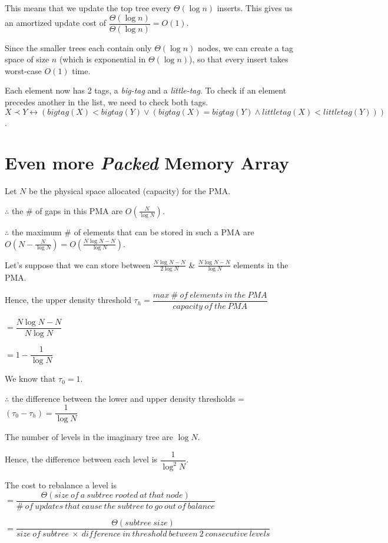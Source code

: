 \documentclass{article}
\begin{document}
This means that we update the top tree every $\Theta(\log{n})$
inserts. This gives us an amortized update cost of
$\dfrac{\Theta(\log{n})}{\Theta(\log{n})} = O(1)$.

Since the smaller trees each contain only $\Theta(\log{n})$ nodes, we
can create a tag space of size $n$ (which is exponential in
$\Theta(\log{n})$), so that every insert takes worst-case $O(1)$ time.

Each element now has 2 tags, a \textit{big-tag} and a
\textit{little-tag}. To check if an element precedes another in the
list, we need to check both tags. $X \prec Y \leftrightarrow
(bigtag(X) < bigtag(Y) \vee (bigtag(X) = bigtag(Y) \wedge littletag(X)
< littletag(Y)))$.

\clearpage

\section{Even more \textit{Packed} Memory Array}

Let $N$ be the physical space allocated (capacity) for the PMA.

$\therefore$ the \# of gaps in this PMA are $O(\frac{N}{\log{N}})$.

$\therefore$ the maximum \# of elements that can be stored in such a
PMA are $O(N - \frac{N}{\log{N}}) = O(\frac{N\log{N} - N}{\log{N}})$.

Let's suppose that we can store between $\frac{N\log{N} - N}{2\log{N}}$ \&
$\frac{N\log{N} - N}{\log{N}}$ elements in the PMA.

Hence, the upper density threshold $\tau_h = \dfrac{max\ \#\ of\ elements\ in\ the\ PMA}{capacity\ of\ the\ PMA}$

$= \dfrac{N\log{N} - N}{N\log{N}}$

$= 1 - \dfrac{1}{\log{N}}$

We know that $\tau_0 = 1$.

$\therefore$ the difference between the lower and upper density thresholds = $(\tau_0 - \tau_h) = \dfrac{1}{\log{N}}$

The number of levels in the imaginary tree are $\log{N}$.

Hence, the difference between each level is $\dfrac{1}{\log^2{N}}$.

The cost to rebalance a level is $= \dfrac{\Theta(size\ of\ a\ subtree\ rooted\ at\ that\ node)}{\#\ of\ updates\ that\ cause\ the\ subtree\ to\ go\ out\ of\ balance}$

$= \dfrac{\Theta(subtree\ size)}{size\ of\ subtree\ \times\ difference\ in\ threshold\ between\ 2\ consecutive\ levels}$
\end{document}
